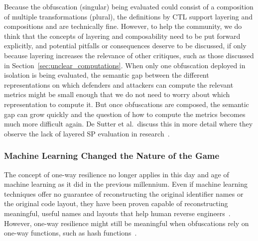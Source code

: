 Because the obfuscation (singular) being evaluated could consist of a composition of multiple transformations (plural), the definitions by CTL support layering and compositions and are technically fine. 
However, to help the community, we do think that the concepts of layering and composability need to be put forward explicitly, and potential pitfalls or consequences deserve to be discussed, if only because layering increases the relevance of other critiques, such as those discussed in Section~\ref{sec:unclear_computations}. 
When only one obfuscation deployed in isolation is being evaluated, the semantic gap between the different representations on which defenders and attackers can compute the relevant metrics might be small enough that we do not need to worry about which representation to compute it. But once obfuscations are composed, the semantic gap can grow quickly and the question of how to compute the metrics becomes much more difficult again. De Sutter et al.\ discuss this in more detail where they observe the lack of layered SP evaluation in research~\cite{desutter2024evaluation}.

\subsubsection{Machine Learning Changed the Nature of the Game}
The concept of one-way resilience no longer applies in this day and age of machine learning as it did in the previous millennium. Even if machine learning techniques offer no guarantee of reconstructing the original identifier names or the original code layout, they have been proven capable of reconstructing meaningful, useful names and layouts that help human reverse engineers~\cite{2017_recovering_clear_natural_identifiers_from_obfuscated_js_names,banerjee2021variablerecoverydecompiledbinary}. However, one-way resilience might still be meaningful when obfuscations rely on one-way functions, such as hash functions~\cite{hash1,hash2}.

